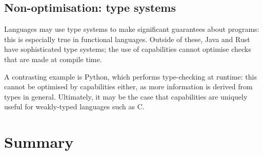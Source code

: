 \documentclass[dissertation.tex]{subfiles}
\begin{document}
\subsection{Non-optimisation: type systems}
Languages may use type systems to make significant guarantees about
programs: this is especially true in functional languages.
Outside of these, Java and Rust have sophisticated type systems; the use
of capabilities cannot optimise checks that are made at compile time.

A contrasting example is Python, which performs type-checking at
runtime: this cannot be optimised by capabilities either, as more
information is derived from types in general.
Ultimately, it may be the case that capabilities are uniquely useful for
weakly-typed languages such as C.


\section{Summary}
\end{document}
